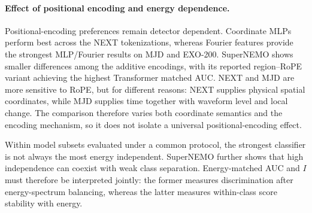 \paragraph{Effect of positional encoding and energy dependence.}
Positional-encoding preferences remain detector dependent. Coordinate MLPs
perform best across the NEXT tokenizations, whereas Fourier features provide
the strongest MLP/Fourier results on MJD and EXO-200. SuperNEMO shows smaller
differences among the additive encodings, with its reported region--RoPE
variant achieving the highest Transformer matched AUC. NEXT and MJD are more
sensitive to RoPE, but for different reasons: NEXT supplies physical spatial
coordinates, while MJD supplies time together with waveform level and local
change. The comparison therefore varies both coordinate semantics and the
encoding mechanism, so it does not isolate a universal positional-encoding
effect.

Within model subsets evaluated under a common protocol, the strongest
classifier is not always the most energy independent. SuperNEMO further shows
that high independence can coexist with weak class separation. Energy-matched
AUC and $I$ must therefore be interpreted jointly: the former measures
discrimination after energy-spectrum balancing, whereas the latter measures
within-class score stability with energy.
